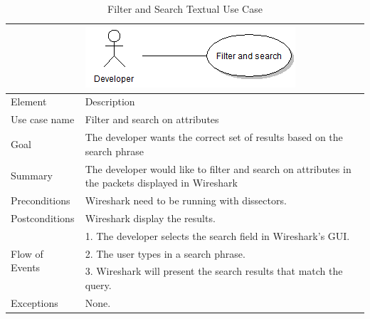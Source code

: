 \begin{table}[htbp] \footnotesize \center
\caption{Filter and Search Textual Use Case\label{tab:textual:filterandsearch}}
\begin{tabularx}{\textwidth}{l X}
	& \includegraphics[scale=0.8]{./planning/img/uc_filterandsearch} \\
	\toprule
	Element & Description\\
	\midrule
	Use case name & Filter and search on attributes\\
	Goal & The developer wants the correct set of results based on the search phrase \\
	Summary & The developer would like to filter and search on attributes in the packets displayed in Wireshark \\
	Preconditions & Wireshark need to be running with dissectors. \\
	Postconditions & Wireshark display the results.\\
	\midrule
	\multirow{3}{*}{Flow of Events} & 1. The developer selects the search field in Wireshark's GUI.  \\
	& 2. The user types in a search phrase. \\
	& 3. Wireshark will present the search results that match the query. \\
	\midrule
	Exceptions & None. \\
	\bottomrule
\end{tabularx}
\end{table}

